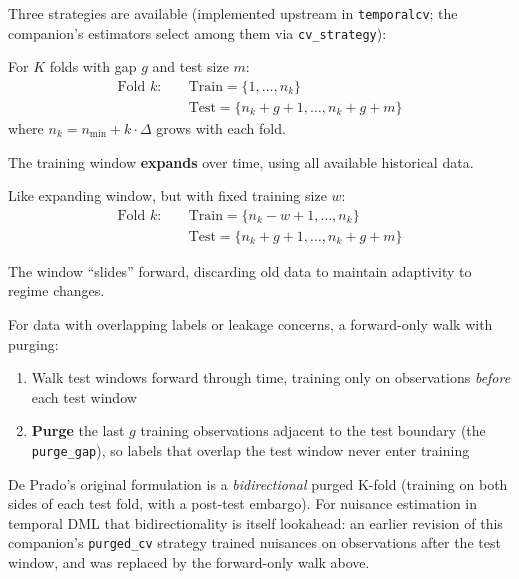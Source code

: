 Three strategies are available (implemented upstream in \texttt{temporalcv}; the companion's estimators select among them via \texttt{cv\_strategy}):

\begin{definition}
\label{def:expanding_cv}
For $K$ folds with gap $g$ and test size $m$:
\begin{align}
\text{Fold } k: \quad &\text{Train} = \{1, \ldots, n_k\} \\
                      &\text{Test} = \{n_k + g + 1, \ldots, n_k + g + m\}
\end{align}
where $n_k = n_{\min} + k \cdot \Delta$ grows with each fold.

The training window \textbf{expands} over time, using all available historical data.
\end{definition}

\begin{definition}
\label{def:sliding_cv}
Like expanding window, but with fixed training size $w$:
\begin{align}
\text{Fold } k: \quad &\text{Train} = \{n_k - w + 1, \ldots, n_k\} \\
                      &\text{Test} = \{n_k + g + 1, \ldots, n_k + g + m\}
\end{align}

The window ``slides'' forward, discarding old data to maintain adaptivity to regime changes.
\end{definition}

\begin{definition}
\label{def:purged_cv}
For data with overlapping labels or leakage concerns, a forward-only walk
with purging:
\begin{enumerate}
    \item Walk test windows forward through time, training only on
          observations \emph{before} each test window
    \item \textbf{Purge} the last $g$ training observations adjacent to the
          test boundary (the \texttt{purge\_gap}), so labels that overlap
          the test window never enter training
\end{enumerate}
\end{definition}

\begin{remark}
De Prado's original formulation is a \emph{bidirectional} purged K-fold
(training on both sides of each test fold, with a post-test embargo). For
nuisance estimation in temporal DML that bidirectionality is itself
lookahead: an earlier revision of this companion's \texttt{purged\_cv}
strategy trained nuisances on observations after the test window, and was
replaced by the forward-only walk above.
\end{remark}

